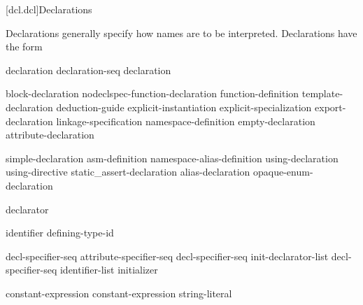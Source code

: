 [dcl.dcl]{Declarations}%



\pnum
Declarations generally specify how names are to be interpreted. Declarations have
the form

\begin{bnf}
\br
    declaration\br
    declaration-seq declaration
\end{bnf}

\begin{bnf}
\br
    block-declaration\br
    nodeclspec-function-declaration\br
    function-definition\br
    template-declaration\br
    deduction-guide\br
    explicit-instantiation\br
    explicit-specialization\br
    export-declaration\br
    linkage-specification\br
    namespace-definition\br
    empty-declaration\br
    attribute-declaration
\end{bnf}

\begin{bnf}
\br
    simple-declaration\br
    asm-definition\br
    namespace-alias-definition\br
    using-declaration\br
    using-directive\br
    static_assert-declaration\br
    alias-declaration\br
    opaque-enum-declaration
\end{bnf}

\begin{bnf}
\br
     declarator \terminal{;}
\end{bnf}

\begin{bnf}
\br
     identifier  \terminal{=} defining-type-id \terminal{;}
\end{bnf}

\begin{bnf}
\br
    decl-specifier-seq  \terminal{;}\br
    attribute-specifier-seq decl-specifier-seq init-declarator-list \terminal{;}\br
     decl-specifier-seq  \terminal{[} identifier-list \terminal{]} initializer \terminal{;}
\end{bnf}

\begin{bnf}
\br
   \terminal{(} constant-expression \terminal{)} \terminal{;}\br
   \terminal{(} constant-expression \terminal{,} string-literal \terminal{)} \terminal{;}
\end{bnf}

